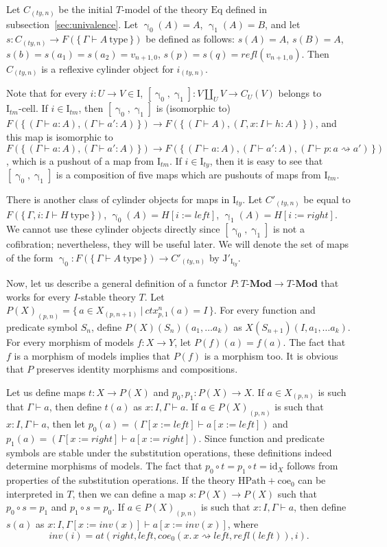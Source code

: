 \documentclass{mscs}
\newcommand{\repl}{:=}
\newcommand{\coeT}{\mathrm{coe}}
\newcommand{\HPath}{\mathrm{HPath}}
\newcommand{\Eq}{\mathrm{Eq}}
\newcommand{\id}{\mathrm{id}}
\newcommand{\refl}{\mathit{refl}}
\newcommand{\leftI}{\mathit{left}}
\newcommand{\rightI}{\mathit{right}}
\newcommand{\coe}{\mathit{coe}}
\newcommand{\idtype}{\rightsquigarrow}
\newcommand{\at}{\mathit{at}}
\newcommand{\inv}{\mathit{inv}}
\newcommand{\cat}[1]{\mathbf{#1}}
\newcommand{\Mod}[1]{#1\text{-}\cat{Mod}}
\newcommand{\type}{\mathrm{type}}
\newcommand{\I}{\mathrm{I}}
\newcommand{\J}{\mathrm{J}}
\newcommand{\class}[2]{#1\text{-}\mathrm{#2}}
\newcommand{\Icell}[1][\I]{\class{#1}{cell}}
\newcommand{\cyli}{\upgamma}
\numberwithin{figure}{section}
\begin{document}
Let $C_{(ty,n)}$ be the initial $T$-model of the theory $\Eq$ defined in subsection~\ref{sec:univalence}.
Let $\cyli_0(A) = A$, $\cyli_1(A) = B$, and let $s : C_{(ty,n)} \to F(\{\,\Gamma \vdash A\ \type\,\})$ be defined as follows:
$s(A) = A$, $s(B) = A$, $s(b) = s(a_1) = s(a_2) = v_{n+1,0}$, $s(p) = s(q) = \refl(v_{n+1,0})$.
Then $C_{(ty,n)}$ is a reflexive cylinder object for $i_{(ty,n)}$.

Note that for every $i : U \to V \in \I$, $[\cyli_0,\cyli_1] : V \amalg_U V \to C_U(V)$ belongs to $\Icell[\I_{tm}]$.
If $i \in \I_{tm}$, then $[\cyli_0,\cyli_1]$ is (isomorphic to) $F(\{\,(\Gamma \vdash a : A), (\Gamma \vdash a' : A)\,\}) \to F(\{\,(\Gamma \vdash A), (\Gamma, x : I \vdash h : A)\,\})$,
and this map is isomorphic to $F(\{\,(\Gamma \vdash a : A), (\Gamma \vdash a' : A)\,\}) \to F(\{\,(\Gamma \vdash a : A), (\Gamma \vdash a' : A), (\Gamma \vdash p : a \idtype a')\,\})$,
which is a pushout of a map from $\I_{tm}$.
If $i \in \I_{ty}$, then it is easy to see that $[\cyli_0,\cyli_1]$ is a composition of five maps which are pushouts of maps from $\I_{tm}$.

There is another class of cylinder objects for maps in $\I_{ty}$.
Let $C'_{(ty,n)}$ be equal to $F(\{\,\Gamma, i : I \vdash H\ \type\,\})$, $\cyli_0(A) = H[i \repl \leftI]$, $\cyli_1(A) = H[i \repl \rightI]$.
We cannot use these cylinder objects directly since $[\cyli_0,\cyli_1]$ is not a cofibration; nevertheless, they will be useful later.
We will denote the set of maps of the form $\cyli_0 : F(\{\,\Gamma \vdash A\ \type\,\}) \to C'_{(ty,n)}$ by $\J'_{\I_{ty}}$.

Now, let us describe a general definition of a functor $P : \Mod{T} \to \Mod{T}$ that works for every $I$-stable theory $T$.
Let $P(X)_{(p,n)} = \{\,a \in X_{(p,n+1)}\ |\ ctx^n_{p,1}(a) = I\,\}$.
For every function and predicate symbol $S_n$, define $P(X)(S_n)(a_1, \ldots a_k)$ as $X(S_{n+1})(I, a_1, \ldots a_k)$.
For every morphism of models $f : X \to Y$, let $P(f)(a) = f(a)$.
The fact that $f$ is a morphism of models implies that $P(f)$ is a morphism too.
It is obvious that $P$ preserves identity morphisms and compositions.

Let us define maps $t : X \to P(X)$ and $p_0,p_1 : P(X) \to X$.
If $a \in X_{(p,n)}$ is such that $\Gamma \vdash a$, then define $t(a)$ as $x : I, \Gamma \vdash a$.
If $a \in P(X)_{(p,n)}$ is such that $x : I, \Gamma \vdash a$, then let $p_0(a) = (\Gamma[x \repl \leftI] \vdash a[x \repl \leftI])$
and $p_1(a) = (\Gamma[x \repl \rightI] \vdash a[x \repl \rightI])$.
Since function and predicate symbols are stable under the substitution operations, these definitions indeed determine morphisms of models.
The fact that $p_0 \circ t = p_1 \circ t = \id_X$ follows from properties of the substitution operations.
If the theory $\HPath + \coeT_0$ can be interpreted in $T$, then we can define a map $s : P(X) \to P(X)$ such that $p_0 \circ s = p_1$ and $p_1 \circ s = p_0$.
If $a \in P(X)_{(p,n)}$ is such that $x : I, \Gamma \vdash a$, then define $s(a)$ as $x : I, \Gamma[x \repl \inv(x)] \vdash a[x \repl \inv(x)]$, where
\[ \inv(i) = \at(\rightI, \leftI, \coe_0(x.\,x \idtype \leftI, \refl(\leftI)), i). \]
\end{document}
